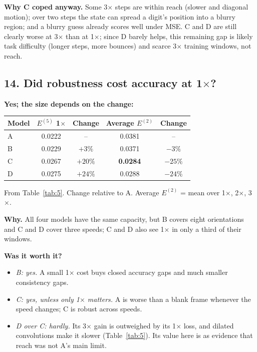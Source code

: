 \documentclass[11pt, a4paper]{article}
\begin{document}
\textbf{Why C coped anyway.} Some 3$\times$ steps are within reach (slower and diagonal motion); over two steps the state can spread a digit's position into a blurry region; and a blurry guess already scores well under MSE. C and D are still clearly worse at 3$\times$ than at 1$\times$; since D barely helps, this remaining gap is likely task difficulty (longer steps, more bounces) and scarce 3$\times$ training windows, not reach.

\subsection*{14. Did robustness cost accuracy at 1$\times$?}

\textbf{Yes; the size depends on the change:}

\begin{center}
\begin{tabular}{lcccc}
\toprule
Model & $E^{(5)}$ 1$\times$ & Change & Average $E^{(2)}$ & Change \\
\midrule
A & 0.0222 & -- & 0.0381 & -- \\
B & 0.0229 & $+3\%$ & 0.0371 & $-3\%$ \\
C & 0.0267 & $+20\%$ & \textbf{0.0284} & $-25\%$ \\
D & 0.0275 & $+24\%$ & 0.0288 & $-24\%$ \\
\bottomrule
\end{tabular}

\smallskip
{\small From Table~\ref{tab:5}. Change relative to A. Average $E^{(2)}$ = mean over 1$\times$, 2$\times$, 3$\times$.}
\end{center}

\textbf{Why.} All four models have the same capacity, but B covers eight orientations and C and D cover three speeds; C and D also see 1$\times$ in only a third of their windows.

\textbf{Was it worth it?}
\begin{itemize}[itemsep=0pt]
  \item \emph{B: yes.} A small 1$\times$ cost buys closed accuracy gaps and much smaller consistency gaps.
  \item \emph{C: yes, unless only 1$\times$ matters.} A is worse than a blank frame whenever the speed changes; C is robust across speeds.
  \item \emph{D over C: hardly.} Its 3$\times$ gain is outweighed by its 1$\times$ loss, and dilated convolutions make it slower (Table~\ref{tab:5}). Its value here is as evidence that reach was not A's main limit.
\end{itemize}
\end{document}
